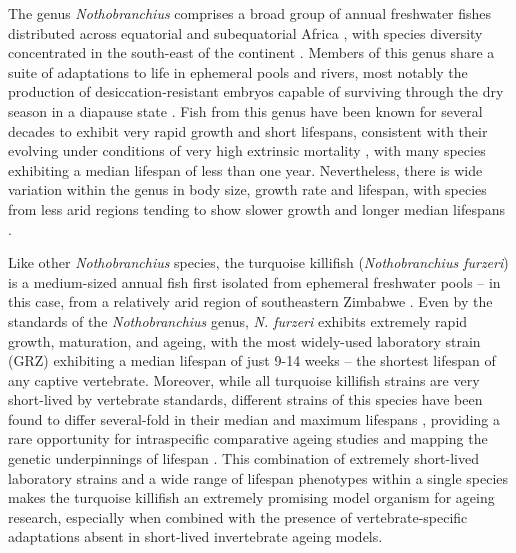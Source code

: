 The genus \textit{Nothobranchius} comprises a broad group of annual freshwater fishes distributed across equatorial and subequatorial Africa \citep{valdesalici2003lifespan}, with species diversity concentrated in the south-east of the continent \citep{genade2005annual}. Members of this genus share a suite of adaptations to life in ephemeral pools and rivers, most notably the production of desiccation-resistant embryos capable of surviving through the dry season in a diapause state \citep{genade2005annual}. Fish from this genus have been known for several decades to exhibit very rapid growth and short lifespans, consistent with their evolving under conditions of very high extrinsic mortality \citep{valdesalici2003lifespan}, with many species exhibiting a median lifespan of less than one year. Nevertheless, there is wide variation within the genus in body size, growth rate and lifespan, with species from less arid regions tending to show slower growth and longer median lifespans \citep{genade2005annual}.

Like other \textit{Nothobranchius} species, the turquoise killifish (\textit{Nothobranchius furzeri}) is a medium-sized annual fish first isolated from ephemeral freshwater pools -- in this case, from a relatively arid region of southeastern Zimbabwe \citep{jubb1971new,genade2005annual}. Even by the standards of the \textit{Nothobranchius} genus, \textit{N. furzeri} exhibits extremely rapid growth, maturation, and ageing, with the most widely-used laboratory strain (GRZ) exhibiting a median lifespan of just 9-14 weeks \citep{valdesalici2003lifespan,genade2005annual,terzibasi2008strains,kirschner2012map,valenzano2015genome} %
-- the shortest lifespan of any captive vertebrate. Moreover, while all turquoise killifish strains are very short-lived by vertebrate standards, different strains of this species have been found to differ several-fold in their median and maximum lifespans \citep{terzibasi2008strains,kirschner2012map}, providing a rare opportunity for intraspecific comparative ageing studies \citep{terzibasi2008strains,terzibasi2009dr,hartmann2009telomeres} and mapping the genetic underpinnings of lifespan \citep{kirschner2012map}. This combination of extremely short-lived laboratory strains and a wide range of lifespan phenotypes within a single species makes the turquoise killifish an extremely promising model organism for ageing research, especially when combined with the presence of vertebrate-specific adaptations absent in short-lived invertebrate ageing models.


